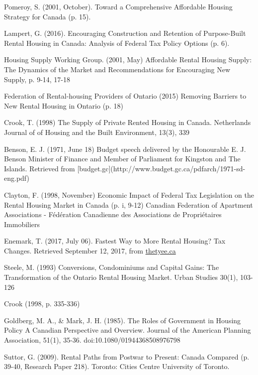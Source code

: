 \begin{thebibliography}{9}
 Pomeroy, S. (2001, October). Toward a Comprehensive Affordable Housing Strategy for Canada (p. 15).

Lampert, G. (2016). Encouraging Construction and Retention of Purpose-Built Rental Housing in Canada: Analysis of Federal Tax Policy Options (p. 6). 

 Housing Supply Working Group. (2001, May) Affordable Rental Housing Supply: The Dynamics of the Market and Recommendations for Encouraging New Supply, p. 9-14, 17-18

 Federation of Rental-housing Providers of Ontario (2015) Removing Barriers to New Rental Housing in Ontario (p. 18)

 Crook, T. (1998) The Supply of Private Rented Housing in Canada. Netherlands Journal of of Housing and the Built Environment, 13(3), 339

 Benson, E. J. (1971, June 18) Budget speech delivered by the Honourable E. J. Benson Minister of Finance and Member of Parliament for Kingston and The Islands. Retrieved from [budget.gc](http://www.budget.gc.ca/pdfarch/1971-sd-eng.pdf)

 Clayton, F. (1998, November) Economic Impact of Federal Tax Legislation on the Rental Housing Market in Canada (p. i, 9-12) Canadian Federation of Apartment Associations - Fédération Canadienne des Associations de Propriétaires Immobiliers

  Enemark, T. (2017, July 06). Fastest Way to More Rental Housing? Tax Changes. Retrieved September 12, 2017, from \href{https://thetyee.ca/Opinion/2017/07/06/Tax-Changes-More-Rental-Housing/}{thetyee.ca}

  Steele, M. (1993) Conversions, Condominiums and Capital Gains: The Transformation of the Ontario Rental Housing Market. Urban Studies 30(1), 103-126

 Crook (1998, p. 335-336)

 Goldberg, M. A., \& Mark, J. H. (1985). The Roles of Government in Housing Policy A Canadian Perspective and Overview. Journal of the American Planning Association, 51(1), 35-36. doi:10.1080/01944368508976798

 Suttor, G. (2009). Rental Paths from Postwar to Present: Canada Compared (p. 39-40, Research Paper 218). Toronto: Cities Centre University of Toronto.


\end{thebibliography}
